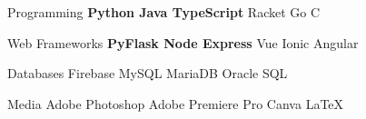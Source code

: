 

\begin{cvskills}

  \cvskill
  {Programming} %
  {\textbf{Python {\enskip\cdotp\enskip} Java {\enskip\cdotp\enskip} TypeScript} {\enskip\cdotp\enskip} Racket {\enskip\cdotp\enskip} Go {\enskip\cdotp\enskip} C } %

  \cvskill
  {Web Frameworks} %
  {\textbf{PyFlask {\enskip\cdotp\enskip} Node Express} {\enskip\cdotp\enskip} Vue {\enskip\cdotp\enskip} Ionic Angular}%

  \cvskill
  {Databases} %
  {Firebase {\enskip\cdotp\enskip} MySQL {\enskip\cdotp\enskip} MariaDB {\enskip\cdotp\enskip} Oracle SQL} %


  \cvskill
  {Media} %
  {Adobe Photoshop {\enskip\cdotp\enskip} Adobe Premiere Pro {\enskip\cdotp\enskip} Canva {\enskip\cdotp\enskip} \LaTeX} %



\end{cvskills}
